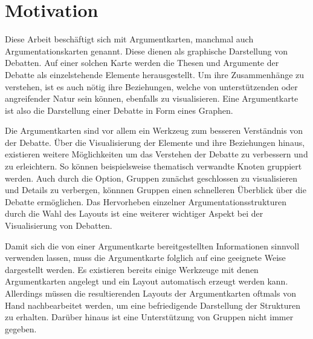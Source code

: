 \chapter{Motivation}
Diese Arbeit beschäftigt sich mit Argumentkarten, manchmal auch Argumentationskarten genannt. Diese dienen als graphische Darstellung von Debatten. 
Auf einer solchen Karte werden die Thesen und Argumente der Debatte als einzelstehende Elemente herausgestellt. 
Um ihre Zusammenhänge zu verstehen, ist es auch nötig ihre Beziehungen, welche von unterstützenden oder angreifender Natur sein können, ebenfalls zu visualisieren.
Eine Argumentkarte ist also die Darstellung einer Debatte in Form eines Graphen.

Die Argumentkarten sind vor allem ein Werkzeug zum besseren Verständnis von der Debatte. 
Über die Visualisierung der Elemente und ihre Beziehungen hinaus, existieren weitere Möglichkeiten um das Verstehen der Debatte zu verbessern und zu erleichtern.
So können beispielsweise thematisch verwandte Knoten gruppiert werden. 
Auch durch die Option, Gruppen zunächst geschlossen zu visualisieren und Details zu verbergen, könnnen Gruppen einen schnelleren Überblick über die Debatte ermöglichen.
Das Hervorheben einzelner Argumentationsstrukturen durch die Wahl des Layouts ist eine weiterer wichtiger Aspekt bei der Visualisierung von Debatten.

Damit sich die von einer Argumentkarte bereitgestellten Informationen sinnvoll verwenden lassen, muss die Argumentkarte folglich auf eine geeignete Weise dargestellt werden.
Es existieren bereits einige Werkzeuge mit denen Argumentkarten angelegt  und ein Layout automatisch erzeugt werden kann. 
Allerdings müssen die resultierenden Layouts der Argumentkarten oftmals von Hand nachbearbeitet werden, um eine befriedigende Darstellung der Strukturen zu erhalten.
Darüber hinaus ist eine Unterstützung von Gruppen nicht immer gegeben.

